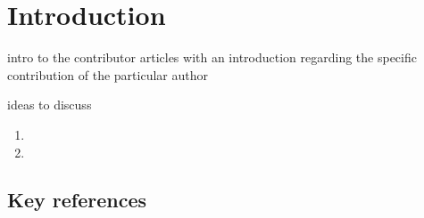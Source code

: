 \chapter{Introduction}

    intro to the contributor articles with an introduction regarding the specific contribution of
    the particular author


    \begin{displayquote}

    \end{displayquote}

    ideas to discuss

    \begin{enumerate}
        \item 
        \item
    \end{enumerate}




    \section{Key references}\label{sec:key-references}

        \begin{enumerate}

        \end{enumerate}

        